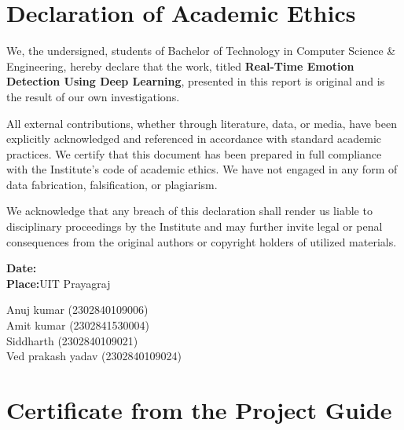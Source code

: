 \documentclass[12pt,a4paper]{report}
\begin{document}

\chapter*{\centering Declaration of Academic Ethics}
\vspace{1cm}

We, the undersigned, students of Bachelor of Technology in Computer Science \& Engineering, hereby declare that the work, titled \textbf{Real-Time Emotion Detection Using Deep Learning}, presented in this report is original and is the result of our own investigations.

All external contributions, whether through literature, data, or media, have been explicitly acknowledged and referenced in accordance with standard academic practices. We certify that this document has been prepared in full compliance with the Institute’s code of academic ethics. We have not engaged in any form of data fabrication, falsification, or plagiarism.

We acknowledge that any breach of this declaration shall render us liable to disciplinary proceedings by the Institute and may further invite legal or penal consequences from the original authors or copyright holders of utilized materials.

\vspace{2cm}
\noindent\textbf{Date:}\\
\noindent\textbf{Place:}\hspace{1cm}UIT Prayagraj

\vspace{1cm}
\begin{flushright}
Anuj kumar (2302840109006)\\
Amit kumar (2302841530004)\\
Siddharth (2302840109021)\\
Ved prakash yadav (2302840109024)
\end{flushright}

\clearpage

\chapter*{\centering Certificate from the Project Guide}
\vspace{1cm}
\end{document}
